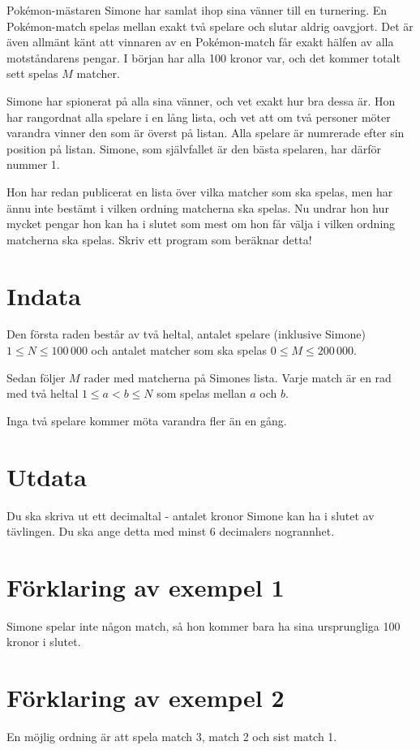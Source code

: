 Pokémon-mästaren Simone har samlat ihop sina vänner till en turnering. En Pokémon-match spelas mellan exakt två spelare och slutar aldrig oavgjort. Det är även allmänt känt att vinnaren av en Pokémon-match får exakt hälfen av alla motståndarens pengar. I början har alla 100 kronor var, och det kommer totalt sett spelas $M$ matcher.

Simone har spionerat på alla sina vänner, och vet exakt hur bra dessa är. Hon har rangordnat alla spelare i en lång lista, och vet att om två personer möter varandra vinner den som är överst på listan. Alla spelare är numrerade efter sin position på listan. Simone, som självfallet är den bästa spelaren, har därför nummer 1.

Hon har redan publicerat en lista över vilka matcher som ska spelas, men har ännu inte bestämt i vilken ordning matcherna ska spelas. Nu undrar hon hur mycket pengar hon kan ha i slutet som mest om hon får välja i vilken ordning matcherna ska spelas. Skriv ett program som beräknar detta!

\section*{Indata}
Den första raden består av två heltal, antalet spelare (inklusive Simone) $1 \leq N \leq 100\,000$ och antalet matcher som ska spelas $0 \leq M \le 200\,000$.

Sedan följer $M$ rader med matcherna på Simones lista. Varje match är en rad med två heltal $1 \le a < b \le N$ som spelas mellan $a$ och $b$.

Inga två spelare kommer möta varandra fler än en gång.

\section*{Utdata}
Du ska skriva ut ett decimaltal - antalet kronor Simone kan ha i slutet av tävlingen. Du ska ange detta med minst $6$ decimalers nogrannhet.

\section*{Förklaring av exempel 1}
Simone spelar inte någon match, så hon kommer bara ha sina ursprungliga 100 kronor i slutet.

\section*{Förklaring av exempel 2}
En möjlig ordning är att spela  match 3, match 2 och sist match 1.

